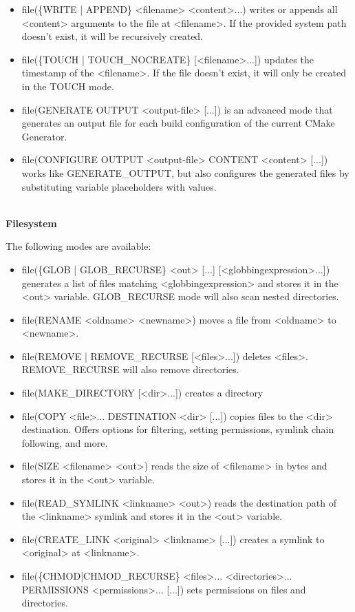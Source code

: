 \begin{itemize}
\item 
file(\{WRITE | APPEND\} <filename> <content>...) writes or appends all <content> arguments to the file at <filename>. If the provided system path doesn't exist, it will be recursively created.

\item 
file(\{TOUCH | TOUCH\_NOCREATE\} [<filename>...]) updates the timestamp of the <filename>. If the file doesn't exist, it will only be created in the TOUCH mode.

\item 
file(GENERATE OUTPUT <output-file> [...]) is an advanced mode that generates an output file for each build configuration of the current CMake Generator.

\item 
file(CONFIGURE OUTPUT <output-file> CONTENT <content> [...]) works like GENERATE\_OUTPUT, but also configures the generated files by substituting variable placeholders with values.
\end{itemize}


\hspace*{\fill} \\ %
\noindent
\textbf{Filesystem}

The following modes are available:

\begin{itemize}
\item 
file(\{GLOB | GLOB\_RECURSE\} <out> [...] [<globbingexpression>...]) generates a list of files matching <globbingexpression> and stores it in the <out> variable. GLOB\_RECURSE mode will also scan nested directories.

\item 
file(RENAME <oldname> <newname>) moves a file from <oldname> to <newname>.

\item 
file({REMOVE | REMOVE\_RECURSE } [<files>...]) deletes <files>. REMOVE\_RECURSE will also remove directories.

\item 
file(MAKE\_DIRECTORY [<dir>...]) creates a directory

\item 
file(COPY <file>... DESTINATION <dir> [...]) copies files to the <dir> destination. Offers options for filtering, setting permissions, symlink chain following, and more.

\item 
file(SIZE <filename> <out>) reads the size of <filename> in bytes and stores it in the <out> variable.

\item 
file(READ\_SYMLINK <linkname> <out>) reads the destination path of the <linkname> symlink and stores it in the <out> variable.

\item
file(CREATE\_LINK <original> <linkname> [...]) creates a symlink to <original> at <linkname>.

\item 
file(\{CHMOD|CHMOD\_RECURSE\} <files>... <directories>... PERMISSIONS <permissions>... [...]) sets permissions on files and directories.
\end{itemize}

